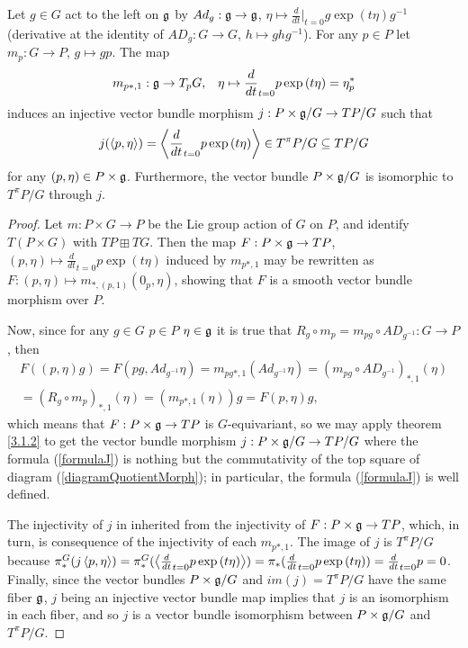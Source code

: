 \begin{theorem}
Let $g \in G$ act to the left on $\mathfrak{g}$ by $Ad_g: \mathfrak{g} \to \mathfrak{g}$, $\eta \mapsto \frac{d}{dt}|_{t=0} g \exp{(t \eta)} g^{-1}$ (derivative at the identity of $AD_g: G \to G$, $h \mapsto g h g^{-1}$). For any $p \in P$ let $m_p: G \to P$, $g \mapsto gp$. The map 
    \begin{align}
        m_{p*, 1}: \mathfrak{g} \to T_p G,& &\eta \mapsto \frac{d}{dt}_{t = 0}p \exp{(t \eta)} = \eta^*_p
    \end{align}
    induces an injective vector bundle morphism $j: P \times \mathfrak{g} / G \to TP/G$ such that 
    \begin{align}\label{formulaJ}
        j(\left\langle p, \mathfrak{\eta} \right\rangle) = \left\langle \frac{d}{dt}_{t = 0} p \exp{(t \mathfrak{\eta})} \right\rangle \in T^\pi P/G \subseteq TP/G
    \end{align} for any $(p, \mathfrak{\eta}) \in P \times \mathfrak{g}$. Furthermore, the vector bundle $P \times \mathfrak{g}/G$ is isomorphic to $T^\pi P/G$ through $j$.
\end{theorem}

\begin{proof}
Let $m: P \times G \to P$ be the Lie group action of $G$ on $P$, and identify $T(P \times G)$ with $TP \boxplus TG$. Then the map $F: P \times \mathfrak{g} \to TP$, $(p, \eta) \mapsto \frac{d}{dt}_{t = 0}p \exp{(t \eta)}$ induced by $m_{p*, 1}$ may be rewritten as $F: (p, \eta) \mapsto m_{*, (p, 1)}(0_p, \eta)$, showing that $F$ is a smooth vector bundle morphism over $P$.

Now, since for any $g \in G$ $p \in P$ $\eta \in \mathfrak{g}$ it is true that $R_g \circ m_p = m_{pg} \circ AD_{g^{-1}} : G \to P$, then 
\begin{multline*}
F((p, \eta)g)
= F(pg, Ad_{g^{-1}}\eta)
= m_{pg*, 1}(Ad_{g^{-1}}\eta)
= (m_{pg} \circ AD_{g^{-1}})_{*, 1}(\eta)\\
= (R_g \circ m_{p})_{*, 1}(\eta) 
= (m_{p*, 1}(\eta))g = F(p, \eta) g,
\end{multline*}
which means that $F: P \times \mathfrak{g} \to TP$ is $G$-equivariant, so we may apply theorem \ref{3.1.2} to get the vector bundle morphism $j: P \times \mathfrak{g}/G \to TP/G$ where the formula (\ref{formulaJ}) is nothing but the commutativity of the top square of diagram (\ref{diagramQuotientMorph}); in particular, the formula (\ref{formulaJ}) is well defined.

The injectivity of $j$ in inherited from the injectivity of $F: P \times \mathfrak{g} \to TP$, which, in turn, is consequence of the injectivity of each $m_{p*, 1}$. The image of $j$ is $T^\pi P/G$ because $\pi_*^G(j\left\langle p, \eta \right\rangle) = \pi_*^G(\left\langle \frac{d}{dt}_{t = 0}p \exp{(t \eta)} \right\rangle) = \pi_*(\frac{d}{dt}_{t = 0}p \exp{(t \eta)}) = \frac{d}{dt}_{t= 0} p = 0$. Finally, since the vector bundles $P \times \mathfrak{g}/G$ and $im(j) = T^\pi P/G$ have the same fiber $\mathfrak{g}$, $j$ being an injective vector bundle map implies that $j$ is an isomorphism in each fiber, and so $j$ is a vector bundle isomorphism between $P \times \mathfrak{g}/G$ and $T^\pi P/G$.
\end{proof}

